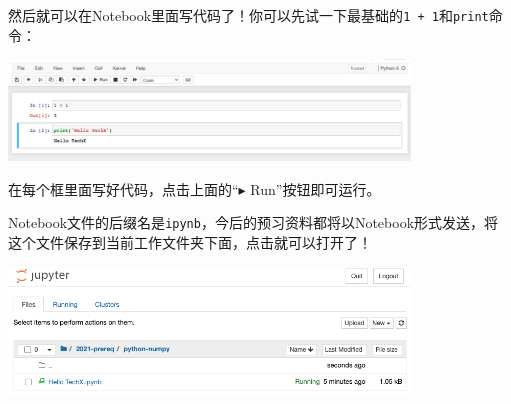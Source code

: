 \documentclass{article}
\begin{document}
然后就可以在Notebook里面写代码了！你可以先试一下最基础的\texttt{1 + 1}和\texttt{print}命令：

\vspace*{0.3cm}\centerline{\noindent\includegraphics[width=0.8\textwidth]{ipynb-code.png}}

在每个框里面写好代码，点击上面的“$\blacktriangleright$ Run”按钮即可运行。

Notebook文件的后缀名是\texttt{ipynb}，今后的预习资料都将以Notebook形式发送，将这个文件保存到当前工作文件夹下面，点击就可以打开了！

\vspace*{0.3cm}\centerline{\noindent\includegraphics[width=0.8\textwidth]{ipynb-open.png}}
\end{document}
